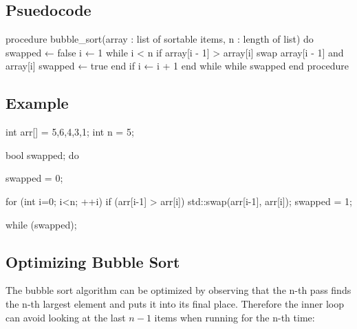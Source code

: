 \documentclass{report}
\begin{document}
    \subsection{Psuedocode}
    \bigbreak \noindent 
    \begin{cppcode}
procedure bubble_sort(array : list of sortable items, n : length of list)
    do
        swapped ← false
        i ← 1
        while i < n
            if array[i - 1] > array[i]
                swap array[i - 1] and array[i]
                swapped ← true
            end if
            i ← i + 1
        end while
    while swapped
end procedure
    \end{cppcode}
    \bigbreak \noindent 

    \bigbreak \noindent 
    \subsection{Example}
    \bigbreak \noindent 
    \begin{cppcode}
        int arr[] = {5,6,4,3,1};
        int n = 5;

        bool swapped;
        do {
            swapped = 0;

            for (int i=0; i<n; ++i) { 
                if (arr[i-1] > arr[i]) {
                    std::swap(arr[i-1], arr[i]);
                    swapped = 1;
                }
            }

        } while (swapped);

    \end{cppcode}


    \bigbreak \noindent 
    \subsection{Optimizing Bubble Sort}
    \bigbreak \noindent 
    The bubble sort algorithm can be optimized by observing that the n-th pass finds the n-th largest element and puts it into its final place. Therefore the inner loop can avoid looking at the last $n-1$ items when running for the n-th time:
    \bigbreak \noindent 
\end{document}
